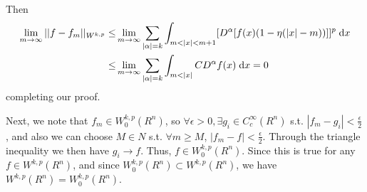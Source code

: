 Then
\begin{align*}
\lim \limits_{m \rightarrow \infty} ||f - f_m||_{W^{k, p}}
  \leq &\lim \limits_{m \rightarrow \infty} \sum_{|\alpha| = k} \int_{m < |x| < m + 1} [D^\alpha [f(x) (1 - \eta(|x| - m))]]^p \;\mathrm{d}x\\
  \leq &\lim \limits_{m \rightarrow \infty} \sum_{|\alpha| = k} \int_{m < |x|} C D^\alpha f(x) \;\mathrm{d}x = 0
\end{align*}
completing our proof.

Next, we note that $f_m \in W_{0}^{k, p}(R^n)$, so
$\forall \epsilon > 0, \exists g_i \in C_c^\infty(R^n)$ s.t. $|f_m - g_i| < \frac{\epsilon}{2}$,
and also we can choose $M \in N$ s.t. $\forall m \geq M$, $|f_m - f| < \frac{\epsilon}{2}$.
Through the triangle inequality we then have $g_i \rightarrow f$.
Thus, $f \in W_0^{k, p}(R^n)$.
Since this is true for any $f \in W^{k, p}(R^n)$, and since $W_0^{k, p}(R^n) \subset W^{k, p}(R^n)$,
we have $W^{k, p}(R^n) = W_0^{k, p}(R^n)$.





